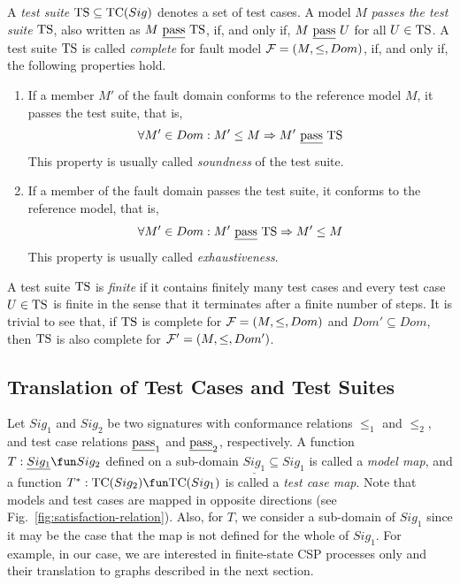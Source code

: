 A \emph{test suite} ${\text{TS}} \subseteq {\text{TC}}(Sig)$ denotes  a set of test cases. A
model $M$ \emph{passes the test suite} ${\text{TS}}$, also written as $M\ \underline{\text{pass}}\
{\text{TS}}$, if, and only if, $M\ \pass\ U$ for all $U\in {\text{TS}}$. A test suite ${\text{TS}}$
is called \emph{complete} for fault model ${\cal F} = (M,\le,Dom)$, if, and
only if, the following properties hold.
\begin{enumerate}
\item If a member $M'$ of the fault domain  conforms to the reference model $M$,
it passes the test suite, that is,
$$
\forall M'\in Dom: M'\le M \Rightarrow M'\ \underline{\text{pass}}\ {\text{TS}}
$$
This property is usually called \emph{soundness} of the test suite.

\item If a member of the fault domain passes the test suite, it conforms to the reference model, that is,
$$
\forall M'\in Dom: M'\ \underline{\text{pass}}\ {\text{TS}} \Rightarrow M'\le M
$$
This property is usually called \emph{exhaustiveness}.
\end{enumerate}
A test suite ${\text{TS}}$ is \emph{finite} if it contains finitely many test cases and every test
case $U\in{\text{TS}}$ is finite in the sense that it terminates after a finite number of steps.
It is trivial to see that, if ${\text{TS}}$ is complete  for   ${\cal F} = (M,\le,Dom)$
and $Dom'\subseteq Dom$, then ${\text{TS}}$ is also complete for ${\cal F}' = (M,\le,Dom')$.

\subsection{Translation of Test Cases and Test Suites}
\label{sec:transltt}

Let $Sig_1$ and $Sig_2$ be two signatures with conformance relations $\le_1$
and $\le_2$, and test case relations $\underline{\text{pass}}_1$ and $\underline{\text{pass}}_2$, respectively. A
function $T:\underline{Sig_1} \fun Sig_2$ defined on a sub-domain
$\underline{Sig_1} \subseteq Sig_1$ is called a \emph{model map}, and a
function $T^*:\tc(Sig_2) \fun \tc(Sig_1)$ is called a \emph{test case map}.
Note that models and test cases are mapped in opposite directions (see
Fig.~\ref{fig:satisfaction-relation}). Also, for $T$, we consider a
sub-domain of $Sig_1$ since it may be the case that the map is not defined
for the whole of $Sig_1$. For example, in our case, we are interested in
finite-state CSP processes only and their translation to graphs described in
the next section.

